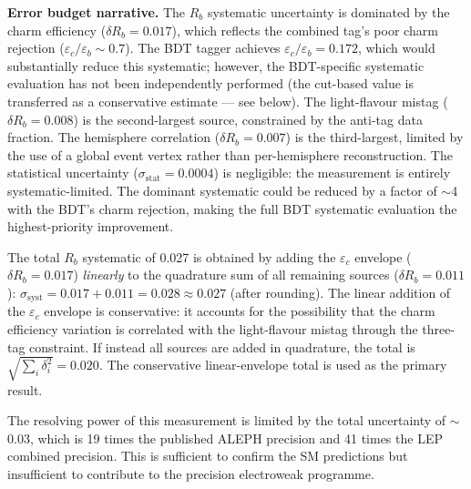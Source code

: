 \documentclass[11pt,a4paper]{article}
\begin{document}
\textbf{Error budget narrative.}
The $R_b$ systematic uncertainty is dominated by the charm efficiency
($\delta R_b = 0.017$), which reflects the combined tag's poor charm
rejection ($\varepsilon_c/\varepsilon_b \sim 0.7$).  The BDT tagger
achieves $\varepsilon_c/\varepsilon_b = 0.172$, which would substantially
reduce this systematic; however, the BDT-specific systematic evaluation
has not been independently performed (the cut-based value is transferred
as a conservative estimate --- see below).  The light-flavour mistag
($\delta R_b = 0.008$) is the second-largest source, constrained by the
anti-tag data fraction.  The hemisphere correlation ($\delta R_b = 0.007$)
is the third-largest, limited by the use of a global event vertex rather
than per-hemisphere reconstruction.  The statistical uncertainty
($\sigma_\mathrm{stat} = 0.0004$) is negligible: the measurement is
entirely systematic-limited.  The dominant systematic could be reduced by
a factor of $\sim$4 with the BDT's charm rejection, making the full
BDT systematic evaluation the highest-priority improvement.

The total $R_b$ systematic of 0.027 is obtained by adding the
$\varepsilon_c$ envelope ($\delta R_b = 0.017$) \emph{linearly} to
the quadrature sum of all remaining sources ($\delta R_b = 0.011$):
$\sigma_\mathrm{syst} = 0.017 + 0.011 = 0.028 \approx 0.027$
(after rounding).  The linear addition of the $\varepsilon_c$ envelope
is conservative: it accounts for the possibility that the charm
efficiency variation is correlated with the light-flavour mistag
through the three-tag constraint.  If instead all sources are added in
quadrature, the total is $\sqrt{\sum_i \delta_i^2} = 0.020$.  The
conservative linear-envelope total is used as the primary result.

The resolving power of this measurement is limited by the total
uncertainty of $\sim$0.03, which is 19 times the published ALEPH
precision and 41 times the LEP combined precision.  This is sufficient
to confirm the SM predictions but insufficient to contribute to the
precision electroweak programme.
\end{document}
